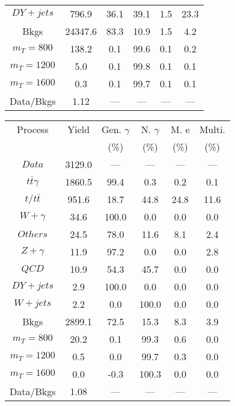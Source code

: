\begin{figure}
\begin{minipage}[c]{0.32\textwidth}
{\begin{tabular}{cccccc}
$ DY+jets $ &  796.9 &  36.1 &  39.1 &  1.5 &  23.3\\
Bkgs &  24347.6 &  83.3 &  10.9 &  1.5 &  4.2\\
$ m_{T} = 800 $ &  138.2 &  0.1 &  99.6 &  0.1 &  0.2\\
$ m_{T} = 1200 $ &  5.0 &  0.1 &  99.8 &  0.1 &  0.1\\
$ m_{T} = 1600 $ &  0.3 &  0.1 &  99.7 &  0.1 &  0.1\\
Data/Bkgs &  1.12 &  --- &  --- &  --- &  ---\\
\hline
\end{tabular}
}
\end{minipage}
\begin{minipage}[c]{0.32\textwidth}
\centering
\tiny{
\begin{tabular}{cccccc}
\hline
Process & Yield & Gen. $\gamma$ & N. $\gamma$ & M. e & Multi. \\
 &  & (\%) & (\%) & (\%) & (\%)  \\
\hline
                                                                      $ Data $ &  3129.0 &  --- &  --- &  --- &  ---\\
$ t\bar{t}\gamma $ &  1860.5 &  99.4 &  0.3 &  0.2 &  0.1\\
$ t/t\bar{t} $ &  951.6 &  18.7 &  44.8 &  24.8 &  11.6\\
$ W+\gamma $ &  34.6 &  100.0 &  0.0 &  0.0 &  0.0\\
$ Others $ &  24.5 &  78.0 &  11.6 &  8.1 &  2.4\\
$ Z+\gamma $ &  11.9 &  97.2 &  0.0 &  0.0 &  2.8\\
$ QCD $ &  10.9 &  54.3 &  45.7 &  0.0 &  0.0\\
$ DY+jets $ &  2.9 &  100.0 &  0.0 &  0.0 &  0.0\\
$ W+jets $ &  2.2 &  0.0 &  100.0 &  0.0 &  0.0\\
Bkgs &  2899.1 &  72.5 &  15.3 &  8.3 &  3.9\\
$ m_{T} = 800 $ &  20.2 &  0.1 &  99.3 &  0.6 &  0.0\\
$ m_{T} = 1200 $ &  0.5 &  0.0 &  99.7 &  0.3 &  0.0\\
$ m_{T} = 1600 $ &  0.0 &  -0.3 &  100.3 &  0.0 &  0.0\\
Data/Bkgs &  1.08 &  --- &  --- &  --- &  ---\\
\hline
\end{tabular}
}
\end{minipage}
\begin{minipage}[c]{0.32\textwidth}
\centering
\tiny{
}
\end{minipage}
\end{figure}
